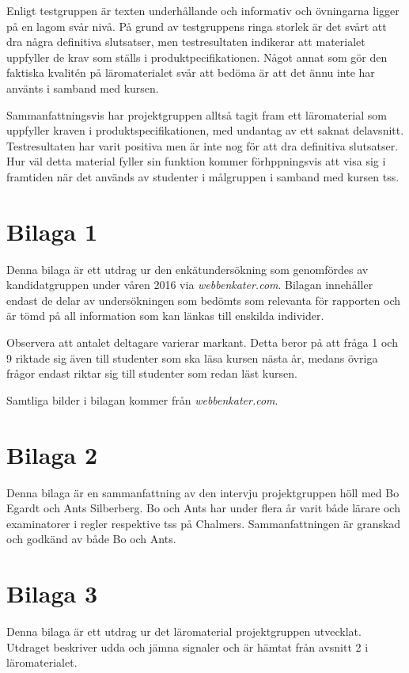 \documentclass[12pt,a4paper,twoside,openright]{article}
\begin{document}
Enligt testgruppen är texten underhållande och informativ och
övningarna ligger på en lagom svår nivå. På grund av testgruppens
ringa storlek är det svårt att dra några definitiva slutsatser, men
testresultaten indikerar att materialet uppfyller de krav som ställs i
produktpecifikationen. Något annat som gör den faktiska kvalitén på
läromaterialet svår att bedöma är att det ännu inte har använts i
samband med kursen.

Sammanfattningsvis har projektgruppen alltså tagit fram ett
läromaterial som uppfyller kraven i produktspecifikationen, med
undantag av ett saknat delavsnitt. Testresultaten har varit positiva
men är inte nog för att dra definitiva slutsatser. Hur väl detta
material fyller sin funktion kommer förhppningsvis att visa sig i
framtiden när det används av studenter i målgruppen i samband med
kursen \gls{tss}.

\newpage




\newpage

\appendix


\section{Bilaga 1}
\label{bil:1}
Denna bilaga är ett utdrag ur den enkätundersökning som genomfördes av
kandidatgruppen under våren 2016 via \textit{webbenkater.com}. Bilagan
innehåller endast de delar av undersökningen som bedömts som relevanta
för rapporten och är tömd på all information som kan länkas till
enskilda individer.

Observera att antalet deltagare varierar markant. Detta beror på att
fråga 1 och 9 riktade sig även till studenter som ska läsa kursen
nästa år, medans övriga frågor endast riktar sig till studenter som
redan läst kursen.

Samtliga bilder i bilagan kommer från \textit{webbenkater.com}.

\newpage

\section{Bilaga 2}
\label{bil:exam_intervju}
Denna bilaga är en sammanfattning av den intervju projektgruppen höll
med Bo Egardt och Ants Silberberg. Bo och Ants har under flera år
varit både lärare och examinatorer i \gls{regler} respektive \gls{tss}
på Chalmers. Sammanfattningen är granskad och godkänd av både Bo och
Ants.


\newpage

\section{Bilaga 3}
\label{bil:3}
Denna bilaga är ett utdrag ur det läromaterial projektgruppen
utvecklat. Utdraget beskriver udda och jämna signaler och är hämtat
från avsnitt 2 i läromaterialet.


\end{document}
